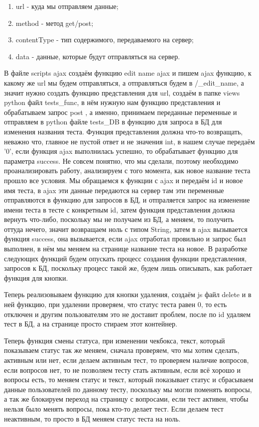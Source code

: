 \documentclass[12pt, oldlfont, amsfonts]{report}
\begin{document}
\begin{enumerate}
\item { url} - куда мы отправляем данные;
\item { method} - метод { get/post};
\item { contentType} - тип содержимого, передаваемого на сервер;
\item { data} - данные, которые будут отправляться на сервер. 
\end{enumerate}

В файле { scripts ajax} создаём функцию { edit name ajax} и пишем ajax функцию, к какому же url мы будем отправляться, а отправляться будем в { /\_edit\_name}, а значит нужно создать функцию представления для { url}, создаём в папке { views} python файл { tests\_func}, в нём нужную нам функцию представления и обрабатываем запрос { post} , а именно, принимаем переданные переменные и отправляем в python файле { tests\_DB} в функцию для запроса в БД для изменения названия теста. Функция представления должна что-то возвращать, неважно что, главное не пустой ответ и не значения { int}, в нашем случае передаём { '0'}, если функция ajax выполнилась успешно, то обрабатывает функцию для параметра { success}. Не совсем понятно, что мы сделали, поэтому необходимо проанализировать работу, анализируем с того момента, как новое название теста прошло все условия. Мы обращаемся к функции с {ajax} и передаём { id} и { новое имя теста}, в ajax эти данные передаются на сервер там эти переменные отправляются в функцию для запросов в БД, и отпраляется запрос на изменение имени теста в тесте с конкретным { id}, затем функция представления должна вернуть что-либо, поскольку мы не получаем из БД, а меняем, то получить оттуда нечего, значит возвращаем ноль с типом { String}, затем в ajax вызывается функция {success}, она вызывается, если ajax отработал провильно и запрос был выполнен, в нём мы меняем на странице название теста на новое. В разработке следующих функций будем опускать процесс создания функции представления, запросов к БД, поскольку процесс такой же, будем лишь описывать, как работает функция для кнопки. 

Теперь реализовываем функцию для кнопки удаления, создаём js файл {delete} и в ней функцию, при удалении проверяем, что статус теста равен 0, то есть отключен и другим пользователям это не доставит проблем, после по id удаляем тест в БД, а на странице просто стираем этот контейнер. 

Теперь функция смены статуса, при изменении чекбокса, текст, который показываем статус так же меняем, сначала проверяем, что мы хотим сделать, активным или нет, если делаем активным тест, то проверяем наличие вопросов, если вопросов нет, то не позволяем тесту стать активным, если всё хорошо и вопросы есть, то меняем статус и текст, который показывает статус и сбрасываем данные пользователей по данному тесту, поскольку мы могли поменять вопросы, а так же блокируем переход на страницу с вопросами, если тест активен, чтобы нельзя было менять вопросы, пока кто-то делает тест. Если делаем тест неактивным, то просто в БД меняем статус теста на ноль.
\end{document}
